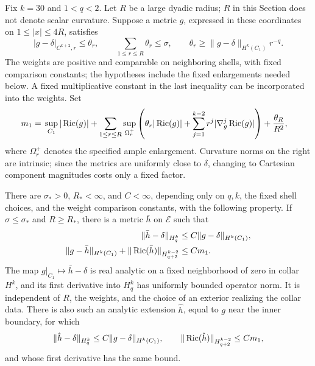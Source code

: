 Fix \(k=30\) and \(1<q<2\).  Let \(R\) be a large dyadic radius;
\(R\) in this Section does not denote scalar curvature.  Suppose a
metric \(g\), expressed in these coordinates on
\(1\le |x|\le4R\), satisfies
\begin{equation}
 |g-\delta|_{C^{k+2},r}\le\theta_r,
 \qquad \sum_{1\le r\le R}\theta_r\le\sigma,
 \qquad
 \theta_r\ge \|g-\delta\|_{H^k(C_1)}r^{-q}.
 \label{collar:metric-smallness}
\end{equation}
The weights are positive and comparable on neighboring shells, with
fixed comparison constants; the hypotheses include the fixed
enlargements needed below.  A fixed multiplicative constant in the
last inequality can be incorporated into the weights.  Set
\begin{equation}
\begin{split}
 m_1={}&\sup_{C_1}|\operatorname{Ric}(g)|
 +\sum_{1\le r\le R}\sup_{\Omega_r^+}
 \left(\theta_r|\operatorname{Ric}(g)|+
       \sum_{j=1}^{k-2}r^j|\nabla_g^j\operatorname{Ric}(g)|\right)
 +\frac{\theta_R}{R^2},
\end{split}
\label{eq:collar-residual}
\end{equation}
where \(\Omega_r^+\) denotes the specified ample enlargement.  Curvature
norms on the right are intrinsic; since the metrics are uniformly
close to \(\delta\), changing to Cartesian component magnitudes costs
only a fixed factor.

\begin{theorem}
\label{thm:collar-extension}
There are \(\sigma_*>0\), \(R_*<\infty\), and \(C<\infty\), depending
only on \(q,k\), the fixed shell choices, and the weight comparison
constants, with the following property.  If
\(\sigma\le\sigma_*\) and \(R\ge R_*\), there is a metric \(\bar h\)
on \(\mathcal E\) such that
\begin{equation}
\begin{split}
 \|\bar h-\delta\|_{H^k_q}
   &\le C\|g-\delta\|_{H^k(C_1)},\\
 \|g-\bar h\|_{H^k(C_1)}
    +\|\operatorname{Ric}(\bar h)\|_{H^{k-2}_{q+2}}
   &\le C m_1.
\end{split}
\label{eq:collar-extension}
\end{equation}
The map \(g|_{C_1}\mapsto\bar h-\delta\) is real analytic on a fixed
neighborhood of zero in collar \(H^k\), and its first derivative into
\(H^k_q\) has uniformly bounded operator norm.  It is independent of
\(R\), the weights, and the choice of an exterior realizing the collar
data.  There is also such an analytic extension \(\hat h\), equal to
\(g\) near the inner boundary, for which
\[
 \|\hat h-\delta\|_{H^k_q}\le C\|g-\delta\|_{H^k(C_1)},
 \qquad
 \|\operatorname{Ric}(\hat h)\|_{H^{k-2}_{q+2}}\le Cm_1,
\]
and whose first derivative has the same bound.
\end{theorem}

